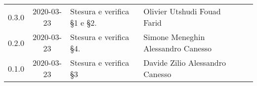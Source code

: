 {\begin{longtable}{ c c  C{4cm}  C{3.8cm}  C{3cm} }
		0.3.0 & 2020-03-23 & Stesura e verifica \S 1 e \S 2. & Olivier Utshudi \newline Fouad Farid &\adm{} \newline  \ver{}\\
		0.2.0 & 2020-03-23 & Stesura e verifica \S 4. & Simone Meneghin \newline Alessandro Canesso &\adm{} \newline  \ver{}\\
		0.1.0 & 2020-03-23 & Stesura e verifica \S 3 & Davide Zilio \newline Alessandro Canesso &\adm{} \newline  \ver{}\\		
	\end{longtable}
}